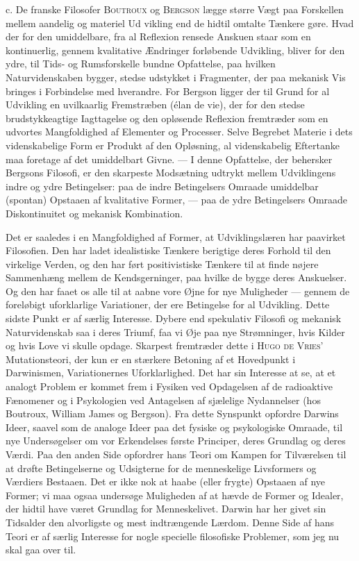 \documentclass[12pt,a4paper,openany]{book}
\newcommand{\opage}[1]{\marginnote{\footnotesize\textit{[#1]}}}
\begin{document}
c. De franske Filosofer \textsc{Boutroux} og \textsc{Bergson} lægge
større Vægt paa Forskellen mellem aandelig og materiel Ud%
\setcounter{footnote}{0}%
\opage{214}vikling end de hidtil omtalte Tænkere gøre. Hvad der for den
umiddelbare, fra al Reflexion rensede Anskuen staar som en
kontinuerlig, gennem kvalitative Ændringer forløbende Udvikling,
bliver for den ydre, til Tids- og Rumsforskelle bundne
Opfattelse, paa hvilken Naturvidenskaben bygger, stedse udstykket
i Fragmenter, der paa mekanisk Vis bringes i Forbindelse
med hverandre. For Bergson ligger der til Grund
for al Udvikling en uvilkaarlig Fremstræben (élan de vie), der
for den stedse brudstykkeagtige Iagttagelse og den opløsende
Reflexion fremtræder som en udvortes Mangfoldighed af Elementer
og Processer. Selve Begrebet Materie i dets videnskabelige
Form er Produkt af den Opløsning, al videnskabelig
Eftertanke maa foretage af det umiddelbart Givne. --- I denne
Opfattelse, der behersker Bergsons Filosofi, er den skarpeste
Modsætning udtrykt mellem Udviklingens indre og ydre Betingelser:
paa de indre Betingelsers Omraade umiddelbar (spontan)
Opstaaen af kvalitative Former, --- paa de ydre Betingelsers
Omraade Diskontinuitet og mekanisk Kombination.

Det er saaledes i en Mangfoldighed af Former, at Udviklingslæren
har paavirket Filosofien. Den har ladet idealistiske
Tænkere berigtige deres Forhold til den virkelige Verden, og
den har ført positivistiske Tænkere til at finde nøjere Sammenhæng
mellem de Kendsgerninger, paa hvilke de bygge deres
Anskuelser. Og den har faaet os alle til at aabne vore Øjne
for nye Muligheder --- gennem de foreløbigt uforklarlige Variationer,
der ere Betingelse for al Udvikling. Dette sidste Punkt
er af særlig Interesse. Dybere end spekulativ Filosofi og mekanisk
Naturvidenskab saa i deres Triumf, faa vi Øje paa nye
Strømninger, hvis Kilder og hvis Love vi skulle opdage. Skarpest
fremtræder dette i \textsc{Hugo de Vries}’ Mutationsteori, der kun er
en stærkere Betoning af et Hovedpunkt i Darwinismen, Variationernes
Uforklarlighed. Det har sin Interesse at se, at et
analogt Problem er kommet frem i Fysiken ved Opdagelsen af
de radioaktive Fænomener og i Psykologien ved Antagelsen af
sjælelige Nydannelser (hos Boutroux, William James og Bergson).
Fra dette Synspunkt opfordre Darwins Ideer, saavel som de
\setcounter{footnote}{0}%
\opage{215}analoge Ideer paa det fysiske og psykologiske Omraade, til nye
Undersøgelser om vor Erkendelses første Principer, deres Grundlag
og deres Værdi. Paa den anden Side opfordrer hans Teori
om Kampen for Tilværelsen til at drøfte Betingelserne og Udsigterne
for de menneskelige Livsformers og Værdiers Bestaaen.
Det er ikke nok at haabe (eller frygte) Opstaaen af nye Former;
vi maa ogsaa undersøge Muligheden af at hævde de Former
og Idealer, der hidtil have været Grundlag for Menneskelivet.
Darwin har her givet sin Tidsalder den alvorligste og
mest indtrængende Lærdom. Denne Side af hans Teori er af
særlig Interesse for nogle specielle filosofiske Problemer, som
jeg nu skal gaa over til.
\end{document}
